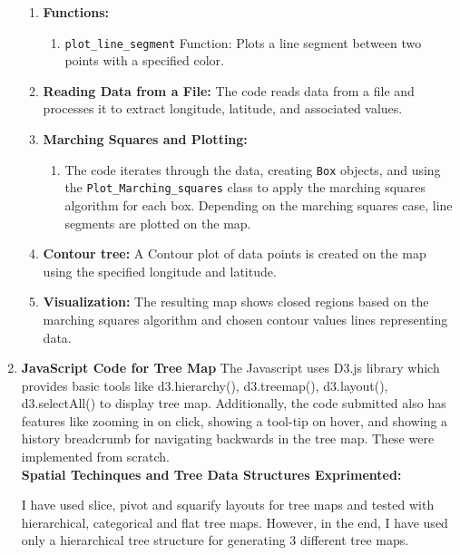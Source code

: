 \documentclass[conference]{IEEEtran}
\begin{document}
\begin{enumerate}
\begin{enumerate}
    \item \textbf{Functions:}
        \begin{enumerate}
            \item \texttt{plot\_line\_segment} Function: Plots a line segment between two points with a specified color.
        \end{enumerate}

    \item \textbf{Reading Data from a File:} The code reads data from a file and processes it to extract longitude, latitude, and associated values.

    \item \textbf{Marching Squares and Plotting:}
        \begin{enumerate}
            \item The code iterates through the data, creating \texttt{Box} objects, and using the \texttt{Plot\_Marching\_squares} class to apply the marching squares algorithm for each box. Depending on the marching squares case, line segments are plotted on the map.
        \end{enumerate}

    \item \textbf{Contour tree:} A Contour plot of data points is created on the map using the specified longitude and latitude.

    \item \textbf{Visualization:} The resulting map shows closed regions based on the marching squares algorithm and chosen contour values lines representing data.\\
\end{enumerate}


\item \textbf{JavaScript Code for Tree Map}
The Javascript uses D3.js library which provides basic tools like d3.hierarchy(), d3.treemap(), d3.layout(), d3.selectAll() to display tree map. Additionally, the code submitted also has features like zooming in on click, showing a tool-tip on hover, and showing a history breadcrumb for navigating backwards in the tree map. These were implemented from scratch.\\


\textbf{Spatial Techinques and Tree Data Structures Exprimented: }

I have used slice, pivot and squarify layouts for tree maps and tested with hierarchical, categorical and flat tree maps. However, in the end, I have used only a hierarchical tree structure for generating 3 different tree maps.\\


\end{enumerate}
\end{document}
